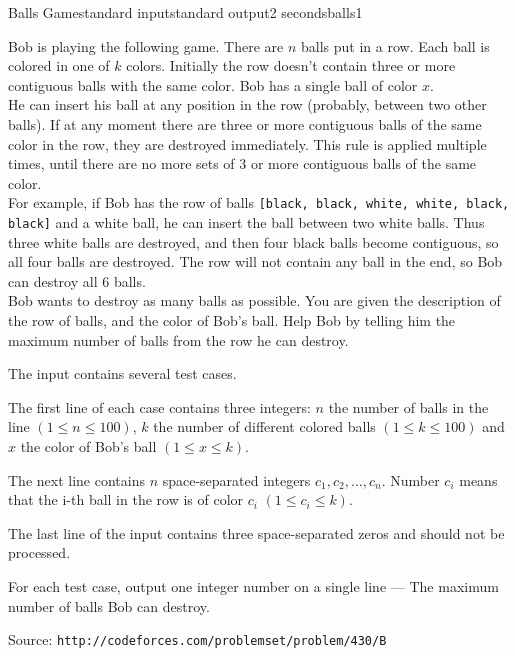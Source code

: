 \begin{problem}{Balls Game}{standard input}{standard output}{2 seconds}{balls1}

Bob is playing the following game. There are $n$ balls put in a row. Each ball is colored in one of $k$ colors. Initially the row doesn't contain three or more contiguous balls with the same color. Bob has a single ball of color $x$.\\
He can insert his ball at any position in the row (probably, between two other balls). If at any moment there are three or more contiguous balls of the same color in the row, they are destroyed immediately. This rule is applied multiple times, until there are no more sets of 3 or more contiguous balls of the same color.\\
For example, if Bob has the row of balls \verb|[black, black, white, white, black, black]| and a white ball, he can insert the ball between two white balls. Thus three white balls are destroyed, and then four black balls become contiguous, so all four balls are destroyed. The row will not contain any ball in the end, so Bob can destroy all 6 balls.\\
Bob wants to destroy as many balls as possible. You are given the description of the row of balls, and the color of Bob's ball. Help Bob by telling him the maximum number of balls from the row he can destroy.

\InputFile

The input contains several test cases.

The first line of each case contains three integers: $n$ the number of balls in the line $ (1 \leq n \leq 100)$, $k$ the number of different colored balls $(1 \leq k \leq 100)$ and $x$ the color of Bob's ball $(1 \leq x \leq k)$.

The next line contains $n$ space-separated integers $c_1, c_2, \ldots, c_n$. Number $c_i$ means that the i-th ball in the row is of color $c_i$ $(1 \leq c_i \leq k)$.

The last line of the input contains three space-separated zeros and should not be processed.

\OutputFile

For each test case, output one integer number on a single line --- The maximum number of balls Bob can destroy.
\Example

\begin{example}
%
\end{example}

Source: \verb|http://codeforces.com/problemset/problem/430/B|

\end{problem}
